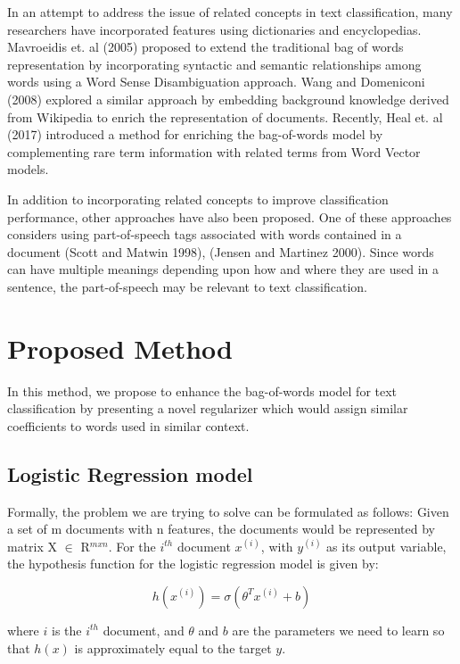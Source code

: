 In an attempt to address the issue of related concepts in text classification, many researchers have incorporated features using dictionaries and encyclopedias. Mavroeidis et. al \cite{mavroeidis2005word} (2005) proposed to extend the traditional bag of words representation by incorporating syntactic and semantic relationships among words using a Word Sense Disambiguation approach. Wang and Domeniconi \cite{wang2008building} (2008) explored a similar approach by embedding background knowledge derived from Wikipedia to enrich the representation of documents. Recently, Heal et. al \cite{heap2017word} (2017) introduced a method for enriching the bag-of-words model by complementing rare term information with related terms from Word Vector models.

In addition to incorporating related concepts to improve classification performance, other approaches have also been proposed. One of these approaches considers using part-of-speech tags associated with words contained in a document (Scott and Matwin \cite{scott1998text} 1998), (Jensen and Martinez \cite{jensen2000improving} 2000). Since words can have multiple meanings depending upon how and where they are used in a sentence, the part-of-speech may be relevant to text classification.

\chapter{Proposed Method}

In this method, we propose to enhance the bag-of-words model for text classification by presenting a novel regularizer which would assign similar coefficients to words used in similar context.

\section{Logistic Regression model}

Formally, the problem we are trying to solve can be formulated as follows: Given a set of m documents with n features, the documents would be represented by matrix X $\in$ R$^{m x n}$. For the $i^{th}$ document $x^{(i)}$, with $y^{(i)}$ as its output variable, the hypothesis function for the logistic regression model is given by:

\begin{equation}
h(x^{(i)}) = \sigma(\theta^{T}x^{(i)} + b)
\end{equation}

where $i$ is the $i^{th}$ document, and $\theta$ and $b$ are the parameters we need to learn so that $h(x)$ is approximately equal to the target $y$.

